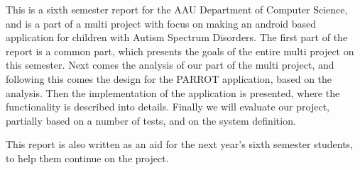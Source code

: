 This is a sixth semester report for the AAU Department of Computer Science, and is a part of a multi project with focus on making an android based application for children with Autism Spectrum Disorders. The first part of the report is a common part, which presents the goals of the entire multi project on this semester. Next comes the analysis of our part of the multi project, and following this comes the design for the  PARROT application, based on the analysis.
Then the implementation of the application is presented, where the functionality is described into details. 
Finally we will evaluate our project, partially based on a number of tests, and on the system definition.

This report is also written as an aid for the next year's sixth semester students, to help them continue on the project.   




